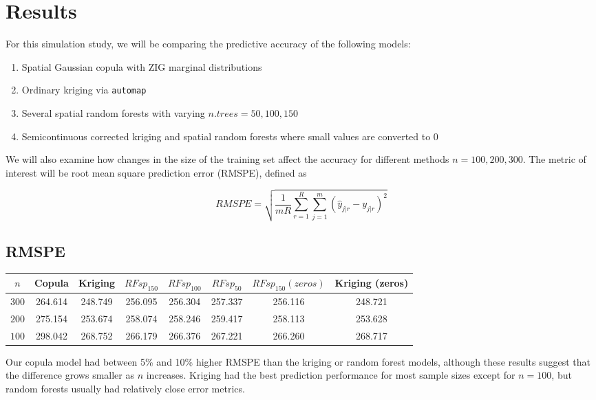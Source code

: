 \documentclass{article}
\begin{document}
\section{Results}
For this simulation study, we will be comparing the predictive accuracy of the following models: \begin{enumerate}
	\item Spatial Gaussian copula with ZIG marginal distributions
	\item Ordinary kriging via \texttt{automap}
	\item Several spatial random forests with varying $n.trees = 50, 100, 150$
	\item Semicontinuous corrected kriging and spatial random forests where small values are converted to 0
\end{enumerate}

We will also examine how changes in the size of the training set affect the accuracy for different methods $n = 100, 200, 300$.
The metric of interest will be root mean square prediction error (RMSPE), defined as

$$
RMSPE = \sqrt{\frac{1}{mR} \sum_{r=1}^R \sum_{j=1}^m (\hat{y}_{j|r} - y_{j|r})^2}
$$

\subsection{RMSPE}
\begin{center}
\begin{tabular}{|| c | c c c c c c c ||}
\hline
$n$ & Copula & Kriging & $RFsp_{150}$ & $RFsp_{100}$ & $RFsp_{50}$ & $RFsp_{150}(zeros)$ & Kriging (zeros) \\ [.5ex] 
\hline\hline
	$300$ & 264.614 & 248.749 & 256.095 & 256.304 & 257.337 & 256.116 & 248.721 \\
	$200$ & 275.154 & 253.674 & 258.074 & 258.246 & 259.417 & 258.113 & 253.628 \\
	$100$ & 298.042 & 268.752 & 266.179 & 266.376 & 267.221 & 266.260 & 268.717 \\ [.5ex] 
\hline
\end{tabular}
\end{center}

Our copula model had between 5\% and 10\% higher RMSPE than the kriging or random forest models, although these results suggest that the difference grows smaller as $n$ increases.
Kriging had the best prediction performance for most sample sizes except for $n = 100$, but random forests usually had relatively close error metrics.
\end{document}
